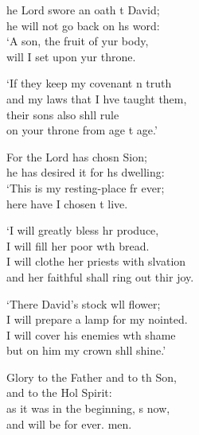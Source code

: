 \settowidth{\versewidth}{I will clothe her priests with salvation *}
\begin{psalmverse}%
  \begin{patverse}
he Lord swore an oath t David;\Med\\
    he will not go back on h\pointup{\i}s word:\\
‘A son, the fruit of yur body,\Med\\
    will I set upon yur throne.

‘If they keep my covenant \pointup{\i}n truth\Med\\
    and my laws that I hve taught them,\\
their sons also shll rule\Med\\
    on your throne from age t age.’

For the Lord has chosn Sion;\Med\\
    he has desired it for h\pointup{\i}s dwelling:\\
‘This is my resting-place fr ever;\Med\\
    here have I chosen t live.

‘I will greatly bless hr produce,\Med\\
    I will fill her poor w\pointup{\i}th bread.\\
I will clothe her priests with slvation\Med\\
    and her faithful shall ring out thir joy.

‘There David’s stock w\pointup{\i}ll flower;\Med\\
    I will prepare a lamp for my nointed.\\
I will cover his enemies w\pointup{\i}th shame\Med\\
    but on him my crown shll shine.’

Glory to the Father and to th Son,\Med\\
    and to the Hol Spirit:\\
as it was in the beginning, \pointup{\i}s now,\Med\\
    and will be for ever. men.
  \end{patverse}
\end{psalmverse}
